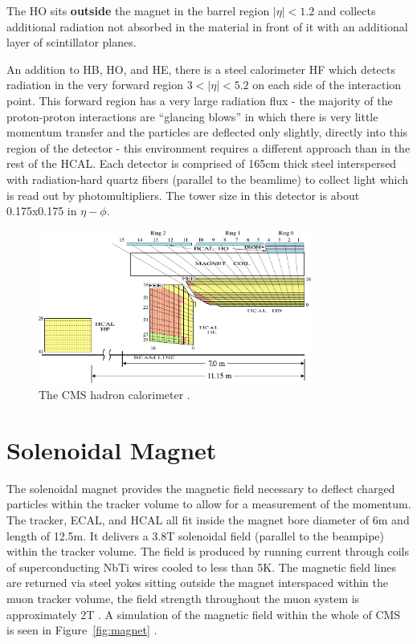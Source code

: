 The HO sits \textbf{outside} the magnet in the barrel region $|\eta|<1.2$ and collects additional radiation not absorbed in the material in front of it with an additional layer of scintillator planes.

An addition to HB, HO, and HE, there is a steel calorimeter HF which detects radiation in the very forward region $3<|\eta|<5.2$ on each side of the interaction point. This forward region has a very large radiation flux - the majority of the proton-proton interactions are ``glancing blows'' in which there is very little momentum transfer and the particles are deflected only slightly, directly into this region of the detector - this environment requires a different approach than in the rest of the HCAL. Each detector is comprised of 165cm thick steel interspersed with radiation-hard quartz fibers (parallel to the beamlime) to collect light which is read out by photomultipliers. The tower size in this detector is about 0.175x0.175 in $\eta-\phi$.

\begin{figure}[hbp!]
\centering
\includegraphics[width=0.8\textwidth]{figs/hcal.pdf}
\caption[The CMS hadron calorimeter.]{The CMS hadron calorimeter \cite{cosmichcal}.}
\label{fig:hcal}
\end{figure}

\section{Solenoidal Magnet}

The solenoidal magnet provides the magnetic field necessary to deflect charged particles within the tracker volume to allow for a measurement of the momentum. The tracker, ECAL, and HCAL all fit inside the magnet bore diameter of 6m and length of 12.5m. It delivers a 3.8T solenoidal field (parallel to the beampipe) within the tracker volume. The field is produced by running current through coils of superconducting NbTi wires cooled to less than 5K. The magnetic field lines are returned via steel yokes sitting outside the magnet interspaced within the muon tracker volume, the field strength throughout the muon system is approximately 2T \cite{magnettdr}. A simulation of the magnetic field within the whole of CMS is seen in Figure~\ref{fig:magnet} \cite{magnet}.

